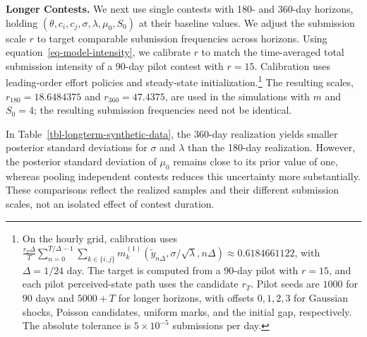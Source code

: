 \documentclass[mnsc]{informs3}
\begin{document}
\textbf{Longer Contests.}
We next use single contests with 180- and 360-day horizons, holding $(\theta,c_i,c_j,\sigma,\lambda,\mu_0,S_0)$ at their baseline values. We adjust the submission scale $r$ to target comparable submission frequencies across horizons. Using equation~\eqref{eq-model-intensity}, we calibrate $r$ to match the time-averaged total submission intensity of a 90-day pilot contest with $r=15$. Calibration uses leading-order effort policies and steady-state initialization.\footnote{On the hourly grid, calibration uses $\frac{r_T\Delta}{T}\sum_{n=0}^{T/\Delta-1}\sum_{k\in\{i,j\}}m_k^{(1)}(\tilde y_{n\Delta},\sigma/\sqrt\lambda,n\Delta)\approx0.6184661122$, with $\Delta=1/24$ day. The target is computed from a 90-day pilot with $r=15$, and each pilot perceived-state path uses the candidate $r_T$. Pilot seeds are $1000$ for 90 days and $5000+T$ for longer horizons, with offsets $0,1,2,3$ for Gaussian shocks, Poisson candidates, uniform marks, and the initial gap, respectively. The absolute tolerance is $5\times10^{-5}$ submissions per day.} The resulting scales, $r_{180}=18.6484375$ and $r_{360}=47.4375$, are used in the simulations with $m$ and $S_0=4$; the resulting submission frequencies need not be identical.

In Table~\ref{tbl-longterm-synthetic-data}, the 360-day realization yields smaller posterior standard deviations for $\sigma$ and $\lambda$ than the 180-day realization. However, the posterior standard deviation of $\mu_0$ remains close to its prior value of one, whereas pooling independent contests reduces this uncertainty more substantially. These comparisons reflect the realized samples and their different submission scales, not an isolated effect of contest duration.
\end{document}
